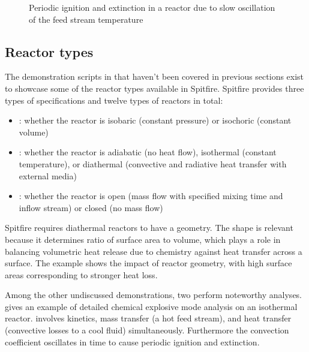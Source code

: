 \documentclass[letterpaper,10pt,english]{sphinxmanual}
\let\sphinxpxdimen\pdfpxdimen\else\newdimen\sphinxpxdimen
\begin{document}
\begin{figure}[htbp]
\centering
\capstart

\noindent\sphinxincludegraphics[width=640\sphinxpxdimen,height=480\sphinxpxdimen]{{oscillatory_feed_temp_example}.png}
\caption{Periodic ignition and extinction in a reactor due to slow oscillation of the feed stream temperature}\label{\detokenize{combustion:id9}}\label{\detokenize{combustion:figure-oscillating-feed-temperature}}\end{figure}


\subsection{Reactor types}
\label{\detokenize{combustion:reactor-types}}
The demonstration scripts in  that haven’t been covered in previous sections exist to showcase some of the reactor types available in Spitfire.
Spitfire provides three types of specifications and twelve types of reactors in total:
\begin{itemize}
\item {} 
: whether the reactor is isobaric (constant pressure) or isochoric (constant volume)

\item {} 
: whether the reactor is adiabatic (no heat flow), isothermal (constant temperature), or diathermal (convective and radiative heat transfer with external media)

\item {} 
: whether the reactor is open (mass flow with specified mixing time and inflow stream) or closed (no mass flow)

\end{itemize}

Spitfire requires diathermal reactors to have a geometry.
The shape is relevant because it determines ratio of surface area to volume, which plays a role in balancing volumetric heat release due to chemistry against heat transfer across a surface.
The  example shows the impact of reactor geometry, with high surface areas corresponding to stronger heat loss.

Among the other undiscussed demonstrations, two perform noteworthy analyses.
 gives an example of detailed chemical explosive mode analysis on an isothermal reactor.
 involves kinetics, mass transfer (a hot feed stream), and heat transfer (convective losses to a cool fluid) simultaneously.
Furthermore the convection coefficient oscillates in time to cause periodic ignition and extinction.
\end{document}
